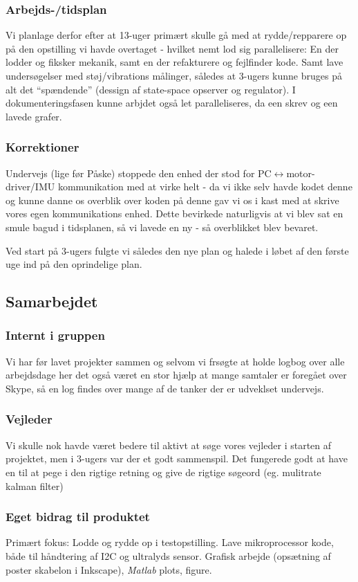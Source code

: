 \subsubsection{Arbejds-/tidsplan}
Vi planlage derfor efter at 13-uger primært skulle gå med at rydde/repparere op
på den opstilling vi havde overtaget - hvilket nemt lod sig parallelisere: En der
lodder og fiksker mekanik, samt en der refakturere og fejlfinder kode. Samt lave
undersøgelser med støj/vibrations målinger, således at 3-ugers kunne bruges på
alt det ``spændende'' (dessign af state-space opserver og regulator).
I dokumenteringsfasen kunne arbjdet også let paralleliseres, da een skrev og een
lavede grafer.
\subsubsection{Korrektioner}
Undervejs (lige før Påske) stoppede den enhed der stod for
PC$\leftrightarrow$motor-driver/IMU kommunikation med at virke helt - da vi ikke
selv havde kodet denne og kunne danne os overblik over koden på denne gav vi os
i kast med at skrive vores egen kommunikations enhed.
Dette bevirkede naturligvis at vi blev sat en smule bagud i tidsplanen, så vi
lavede en ny - så overblikket blev bevaret.

Ved start på 3-ugers fulgte vi således den nye plan og halede i løbet af den
første uge ind på den oprindelige plan.

\subsection{Samarbejdet}
\subsubsection{Internt i gruppen} Vi har før lavet projekter sammen og selvom vi
frsøgte at holde logbog over alle arbejdsdage her det også været en stor hjælp
at mange samtaler er foregået over Skype, så en log findes over mange af de
tanker der er udveklset undervejs.
\subsubsection{Vejleder} Vi skulle nok havde været bedere til aktivt at søge
vores vejleder i starten af projektet, men i 3-ugers var der et godt sammenspil.
Det fungerede godt at have en til at pege i den rigtige retning og give de
rigtige søgeord (eg. mulitrate kalman filter)
\subsubsection{Eget bidrag til produktet}
Primært fokus: Lodde og rydde op i testopstilling. Lave mikroprocessor kode,
både til håndtering af I2C og ultralyds sensor. Grafisk arbejde (opsætning af
poster skabelon i Inkscape), \emph{Matlab} plots, figure.

